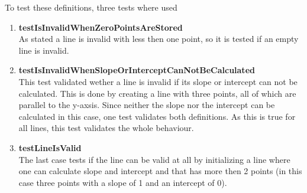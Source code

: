 To test these definitions, three tests where used
\begin{enumerate}
    \item \textbf{testIsInvalidWhenZeroPointsAreStored} \\
    As stated a line is invalid with less then one point, so it is tested if an empty line is invalid.
    \item \textbf{testIsInvalidWhenSlopeOrInterceptCanNotBeCalculated} \\
    This test validated wether a line is invalid if its slope or intercept can not be calculated. This is done by creating a line with three points, all of which are parallel to the y-axsis. Since neither the slope nor the intercept can be calculated in this case, one test validates both definitions. As this is true for all lines, this test validates the whole behaviour.
    \item \textbf{testLineIsValid} \\
    The last case tests if the line can be valid at all by initializing a line where one can calculate slope and intercept and that has more then 2 points (in this case three points with a slope of 1 and an intercept of 0).
\end{enumerate}

